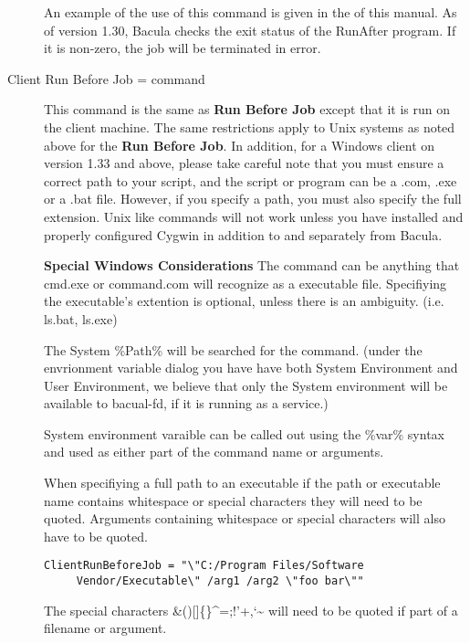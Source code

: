 \begin{description}
   An example of the use of this command is given in the  
    of this manual.  As of version
   1.30, Bacula checks the exit status of the RunAfter  program. If it is
   non-zero, the job will be terminated in error.  

\item [Client Run Before Job = \lt{}command\gt{}]
   This command  is the same as {\bf Run Before Job} except that it is  run on
   the client machine. The same restrictions apply to  Unix systems as noted
   above for the {\bf Run Before Job}. In  addition, for a Windows client on
   version 1.33 and above, please  take careful note that you must ensure a
   correct path to your  script, and the script or program can be a .com, .exe or
   a .bat  file. However, if you specify a path, you must also specify  the full
   extension. Unix like commands will not work unless you  have installed and
   properly configured Cygwin in addition to  and separately from Bacula.  
   
   {\bf Special Windows Considerations}
   The command can be anything that cmd.exe or command.com will  recognize as a
   executable file. Specifiying the executable's  extention is optional, unless
   there is an ambiguity. (i.e.  ls.bat, ls.exe)  
   
   The System \%Path\% will be searched for the command. (under  the envrionment
   variable dialog you have have both System  Environment and User Environment,
   we believe that only the  System environment will be available to bacual-fd,
   if it is  running as a service.)  
   
   System environment varaible can be called out using the \%var\%  syntax and
   used as either part of the command name or  arguments.  
   
   When specifiying a full path to an executable if the path or  executable name
   contains whitespace or special characters they  will need to be quoted.
   Arguments containing whitespace or  special characters will also have to be
   quoted. 

\footnotesize
\begin{verbatim}
ClientRunBeforeJob = "\"C:/Program Files/Software
     Vendor/Executable\" /arg1 /arg2 \"foo bar\""
\end{verbatim}
\normalsize

   The special characters \&()[]\{\}\^{}=;!'+,`\~{} will need to be quoted  if
   part of a filename or argument.  
   

\end{description}
